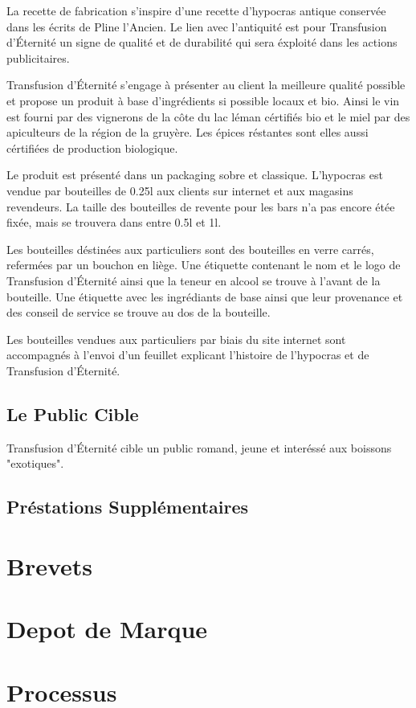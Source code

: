 \documentclass[10pt,a4paper]{article}
\newcommand{\tde}{Transfusion d'Éternité}
\begin{document}
La recette de fabrication s'inspire d'une recette d'hypocras antique conservée dans les écrits de Pline l'Ancien.
Le lien avec l'antiquité est pour \tde{} un signe de qualité et de durabilité qui sera éxploité dans les actions publicitaires.

\tde{} s'engage à présenter au client la meilleure qualité possible et propose un produit à base d'ingrédients si possible locaux et bio.
Ainsi le vin est fourni par des vignerons de la côte du lac léman cértifiés bio et le miel par des apiculteurs de la région de la gruyère.
Les épices réstantes sont elles aussi cértifiées de production biologique.

Le produit est présenté dans un packaging sobre et classique.
L'hypocras est vendue par bouteilles de 0.25l aux clients sur internet et aux magasins revendeurs.
La taille des bouteilles de revente pour les bars n'a pas encore étée fixée, mais se trouvera dans entre 0.5l et 1l.

Les bouteilles déstinées aux particuliers sont des bouteilles en verre carrés, refermées par un bouchon en liège.
Une étiquette contenant le nom et le logo de \tde{} ainsi que la teneur en alcool se trouve à l'avant de la bouteille.
Une étiquette avec les ingrédiants de base ainsi que leur provenance et des conseil de service se trouve au dos de la bouteille.

Les bouteilles vendues aux particuliers par biais du site internet sont accompagnés à l'envoi d'un feuillet explicant l'histoire de l'hypocras et de \tde{}.

\subsection{Le Public Cible}
\tde{} cible un public romand, jeune et interéssé aux boissons "exotiques".
\subsection{Préstations Supplémentaires}
\section{Brevets}
\section{Depot de Marque}
\section{Processus}
\end{document}
